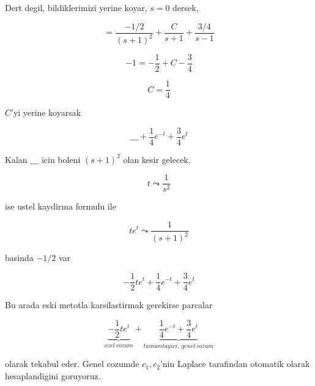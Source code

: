 \documentclass[12pt,fleqn]{article}
\begin{document}
Dert degil, bildiklerimizi yerine koyar, $s=0$ dersek, 

\[ = \frac{-1/2}{(s+1)^2} + \frac{C}{s+1} + \frac{3/4}{s-1} \]

\[ -1 = -\frac{1}{2} + C - \frac{3}{4}\]

\[ C = \frac{1}{4} \]

$C$'yi yerine koyarsak

\[ \_\_\_ + \frac{1}{4}e^{-t}  + \frac{3}{4}e^t  \]

Kalan $\_\_\_$ icin boleni $(s+1)^2$ olan kesir gelecek. 

\[ t \leadsto \frac{1}{s^2} \]

ise ustel kaydirma formulu ile 

\[ te^{t} \leadsto \frac{1}{(s+1)^2} \]

basinda $-1/2$ var

\[ -\frac{1}{2}te^t + \frac{1}{4}e^{-t}  + \frac{3}{4}e^t  \]

Bu arada eski metotla karsilastirmak gerekirse parcalar

\[ \underbrace{-\frac{1}{2}te^t}_{ozel \ cozum} + 
\underbrace{\frac{1}{4}e^{-t}  + \frac{3}{4}e^t}_{tamamlayici, \ genel \ cozum}
\]

olarak tekabul eder. Genel cozumde $c_1,c_2$'nin Laplace tarafindan
otomatik olarak hesaplandigini goruyoruz. 
\end{document}

